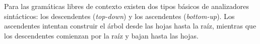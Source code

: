 Para las gramáticas libres de contexto existen dos tipos básicos de analizadores sintácticos: los descendentes (\textit{top-down}) y los ascendentes (\textit{bottom-up}). Los ascendentes intentan construir el árbol desde las hojas hasta la raíz, mientras que los descendentes comienzan por la raíz y bajan hasta las hojas.


%

	
	
	
	


